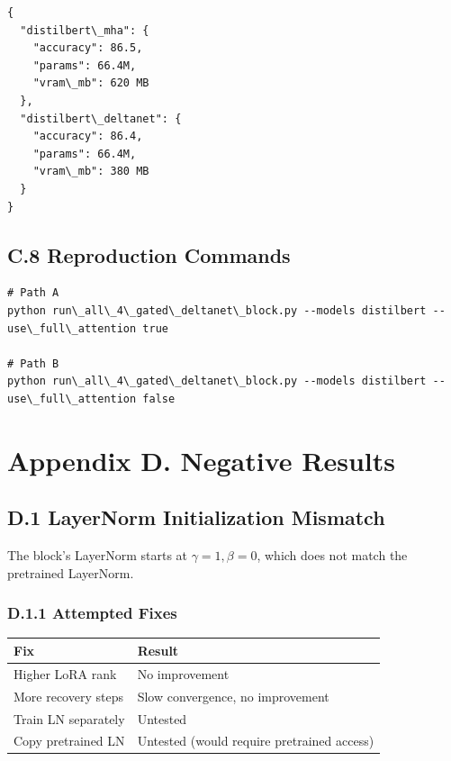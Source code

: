 \begin{lstlisting}
{
  "distilbert\_mha": {
    "accuracy": 86.5,
    "params": 66.4M,
    "vram\_mb": 620 MB
  },
  "distilbert\_deltanet": {
    "accuracy": 86.4,
    "params": 66.4M,
    "vram\_mb": 380 MB
  }
}
\end{lstlisting}

\subsection{C.8 Reproduction Commands}

\begin{lstlisting}
# Path A
python run\_all\_4\_gated\_deltanet\_block.py --models distilbert --use\_full\_attention true

# Path B
python run\_all\_4\_gated\_deltanet\_block.py --models distilbert --use\_full\_attention false
\end{lstlisting}




\section{Appendix D. Negative Results}

\subsection{D.1 LayerNorm Initialization Mismatch}

The block's LayerNorm starts at $\gamma = 1, \beta = 0$, which does not 
match the pretrained LayerNorm.

\subsubsection{D.1.1 Attempted Fixes}

\begin{table}[H]
\centering
\small
\begin{tabular}{ll}
\toprule
\textbf{Fix} & \textbf{Result} \\
\midrule
Higher LoRA rank & No improvement \\
More recovery steps & Slow convergence, no improvement \\
Train LN separately & Untested \\
Copy pretrained LN & Untested (would require pretrained access) \\
\bottomrule
\end{tabular}
\end{table}

